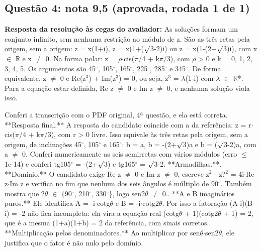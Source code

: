 \documentclass{article}%
\begin{document}
\subsection*{Questão 4: nota 9,5 (aprovada, rodada 1 de 1)}%
\textbf{Resposta da resolução às cegas do avaliador:} As soluções formam um conjunto infinito, sem nenhuma restrição ao módulo de z. São as três retas pela origem, sem a origem: z = x(1+i), z = x(1+($\surd$3-2)i) ou z = x(1-(2+$\surd$3)i), com x $\in$ $\mathbb{R}$ e x $\neq$ 0. Na forma polar: z = $\rho$$\cdot$cis($\pi$/4 + k$\pi$/3), com $\rho$ > 0 e k = 0, 1, 2, 3, 4, 5. Os argumentos são 45$^\circ$, 105$^\circ$, 165$^\circ$, 225$^\circ$, 285$^\circ$ e 345$^\circ$. De forma equivalente, z $\neq$ 0 e Re(z$^3$) + Im(z$^3$) = 0, ou seja, z$^3$ = $\lambda$(1-i) com $\lambda$ $\in$ $\mathbb{R}$*. Para a equação estar definida, Re z $\neq$ 0 e Im z $\neq$ 0, e nenhuma solução viola isso.\par %
Conferi a transcrição com o PDF original, 4ª questão, e ela está correta.\newline%
\newline%
**Resposta final.** A resposta do candidato coincide com a da referência: z = r$\cdot$cis($\pi$/4 + k$\pi$/3), com r > 0 livre. Isso equivale às três retas pela origem, sem a origem, de inclinações 45$^\circ$, 105$^\circ$ e 165$^\circ$: b = a, b = -(2+$\surd$3)a e b = ($\surd$3-2)a, com a $\neq$ 0. Conferi numericamente as seis semirretas com vários módulos (erro $\leq$ 1e-14) e conferi tg105$^\circ$ = -(2+$\surd$3) e tg165$^\circ$ = $\surd$3-2.\newline%
\newline%
**Armadilhas.**. **Domínio.** O candidato exige Re z $\neq$ 0 e Im z $\neq$ 0, escreve z$^2$ - z?$^2$ = 4i$\cdot$Re z$\cdot$Im z e verifica no fim que nenhum dos seis ângulos é múltiplo de 90$^\circ$. Também mostra que 2$\theta$ $\in$ \{90$^\circ$, 210$^\circ$, 330$^\circ$\}, logo sen2$\theta$ $\neq$ 0.. **A e B imaginários puros.** Ele identifica A = -i$\cdot$cotg$\theta$ e B = -i$\cdot$cotg2$\theta$. Por isso a fatoração (A-i)(B-i) = -2 não fica incompleta: ela vira a equação real (cotg$\theta$ + 1)(cotg2$\theta$ + 1) = 2, que é a mesma (1+a)(1+b) = 2 da referência, com sinais corretos.. **Multiplicação pelos denominadores.** Ao multiplicar por sen$\theta$$\cdot$sen2$\theta$, ele justifica que o fator é não nulo pelo domínio.\newline%
\end{document}
